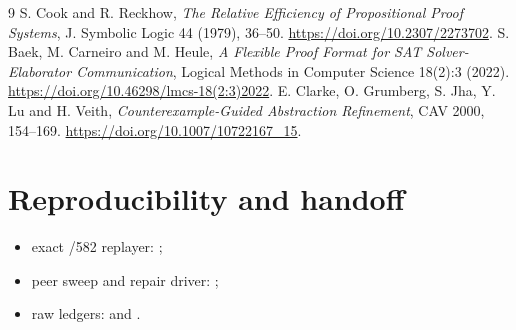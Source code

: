 \documentclass[11pt]{article}
\begin{document}
\begin{thebibliography}{9}
S. Cook and R. Reckhow,
\emph{The Relative Efficiency of Propositional Proof Systems},
J. Symbolic Logic 44 (1979), 36--50.
\url{https://doi.org/10.2307/2273702}.
S. Baek, M. Carneiro and M. Heule,
\emph{A Flexible Proof Format for SAT Solver-Elaborator Communication},
Logical Methods in Computer Science 18(2):3 (2022).
\url{https://doi.org/10.46298/lmcs-18(2:3)2022}.
E. Clarke, O. Grumberg, S. Jha, Y. Lu and H. Veith,
\emph{Counterexample-Guided Abstraction Refinement},
CAV 2000, 154--169.
\url{https://doi.org/10.1007/10722167_15}.
\end{thebibliography}

\section*{Reproducibility and handoff}
\begin{itemize}
\item exact /582 replayer:
;
\item peer sweep and repair driver:
;
\item raw ledgers:
and
.
\end{itemize}

\end{document}
